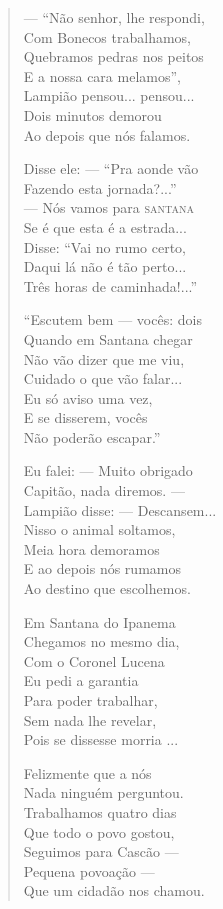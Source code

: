 \begin{verse}
---  ``Não senhor, lhe respondi, \\
Com Bonecos trabalhamos, \\
Quebramos pedras nos peitos \\
E a nossa cara melamos'', \\
Lampião pensou... pensou... \\
Dois minutos demorou \\
Ao depois que nós falamos. 

Disse ele: ---  ``Pra aonde vão \\
Fazendo esta jornada?...'' \\
---  Nós vamos para \textsc{santana} \\
Se é que esta é a estrada... \\
Disse: ``Vai no rumo certo, \\
Daqui lá não é tão perto... \\
Três horas de caminhada!...'' 

``Escutem bem ---  vocês: dois \\
Quando em Santana chegar \\
Não vão dizer que me viu, \\
Cuidado o que vão falar... \\
Eu só aviso uma vez, \\
E se disserem, vocês \\
Não poderão escapar.'' 


Eu falei: ---  Muito obrigado \\
Capitão, nada diremos. --- \\
Lampião disse: ---  Descansem... \\
Nisso o animal soltamos, \\
Meia hora demoramos \\
E ao depois nós rumamos \\
Ao destino que escolhemos. 

Em Santana do Ipanema \\
Chegamos no mesmo dia, \\
Com o Coronel Lucena \\
Eu pedi a garantia \\
Para poder trabalhar, \\
Sem nada lhe revelar, \\
Pois se dissesse morria ... 

Felizmente que a nós \\
Nada ninguém perguntou. \\
Trabalhamos quatro dias \\
Que todo o povo gostou, \\
Seguimos para Cascão --- \\
Pequena povoação ---\\
Que um cidadão nos chamou. 


\end{verse}
